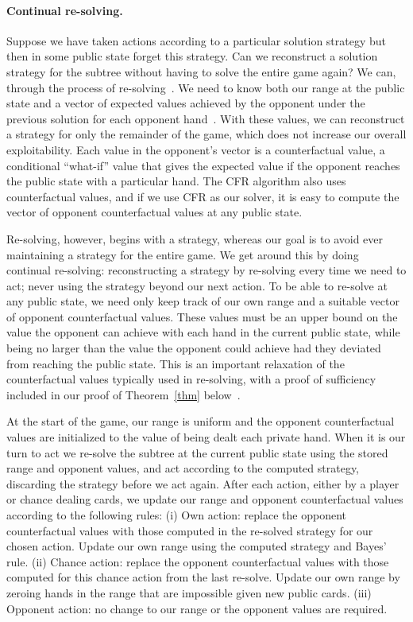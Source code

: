 \documentclass[12pt]{article}
\begin{document}
\paragraph*{Continual re-solving.}
Suppose we have taken actions according to a particular solution strategy 
but then in  some public state forget this strategy.  Can we reconstruct 
a solution strategy for the subtree without having to solve the entire game again?
We can, through the process of re-solving~\cite{cprg:cfrd}.  We need to know both our range at the public state and a vector of expected values achieved by the opponent under the previous solution for each opponent hand~\cite{re-solving-values}.  With these values, we can reconstruct a strategy for only the remainder of the game, which does not increase our overall exploitability.
Each value in the opponent's vector is a counterfactual value, a conditional ``what-if'' value that gives the expected
value if the opponent reaches the public state with a particular hand.  The CFR algorithm also uses
counterfactual values, and if we use CFR as our solver, it is easy to compute the vector of opponent
counterfactual values at any public state.  

Re-solving, however, begins with a strategy, whereas our goal is to avoid ever maintaining a strategy for the entire game.  We get around this by doing continual re-solving: reconstructing a strategy by re-solving every time we need to act; never using the strategy beyond our next action.  To be able to re-solve at any public state, we need only keep track of our own range and a suitable vector of opponent counterfactual values.  These values must be an upper bound on the value the opponent can achieve with each hand in the current public state, while being no larger than the value the opponent could achieve had they deviated from reaching the public state.
This is an important relaxation of the counterfactual values typically used in re-solving, with a proof of sufficiency included in our proof of Theorem~\ref{thm} below~\cite{SOM}.

At the start of the game, our range is uniform and the opponent counterfactual values are initialized to the value of being dealt each private hand.  When it is our turn to act we re-solve the subtree at the current public state using the stored range and opponent values, and act according to the computed strategy, discarding the strategy before we act again.  After each action, either by a player or chance dealing cards, we update our range and opponent counterfactual values according to the following rules: (i) Own action: replace the opponent 
counterfactual values with those computed in the re-solved strategy for our chosen action.
Update our own range using the computed strategy and Bayes' rule.  (ii) Chance action: replace the opponent counterfactual values with those computed for this chance action from the last re-solve.  Update our own range by zeroing hands in the range that are impossible given new public cards. (iii) Opponent action: no change to our range or the opponent values are required.
\end{document}
